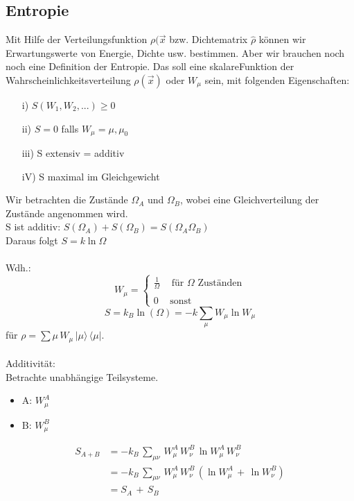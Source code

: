 \documentclass[a4paper,11pt]{scrartcl}
\begin{document}
\subsection{Entropie}
Mit Hilfe der Verteilungsfunktion $\rho(\vec{x}$ bzw. Dichtematrix $\hat{\rho}$ können wir Erwartungswerte von Energie, Dichte usw. bestimmen. Aber wir brauchen noch noch eine Definition der Entropie.  Das soll eine skalareFunktion der Wahrscheinlichkeitsverteilung $\rho(\vec{x})$ oder $W_{\mu}$ sein, mit folgenden Eigenschaften: \\
\begin{itemize}
 \item[i)] $S(W_1, W_2, ...) \geq 0$
 \item[ii)] $ S=0$ falls $W_{\mu} = \mu, \mu_0$
 \item[iii)] S extensiv = additiv
 \item[iV)] S maximal im Gleichgewicht
\end{itemize}
Wir betrachten die Zustände $\Omega_A$ und $\Omega_B$, wobei eine Gleichverteilung der Zustände angenommen wird.\\
S ist additiv: $ S(\Omega_A) + S(\Omega_B) = S(\Omega_A \Omega_B)$\\
Daraus folgt $S = k \ln{\Omega}$\\
\\
Wdh.: 
\begin{equation}
W_{\mu} = \left\{ \begin{array}{c} \frac{1}{\Omega} \,\,\,\,\,\,\, \mathrm{für} \,\, \Omega \,\, \mathrm{Zuständen} \\ \\ 0\,\,\,\,\,\,\, \mathrm{sonst}  \end{array} \right.
\end{equation}
\begin{equation}
 S = k_B \ln(\Omega) = - k \sum_{\mu} W_{\mu} \ln{W_{\mu}}
\end{equation}
für $\rho = \sum{\mu}\, W_{\mu} \, | \mu \rangle \, \langle \mu |$.\\
\\
Additivität:\\
Betrachte unabhängige Teilsysteme. \\
\begin{itemize}
 \item A: $W_{\mu}^A$
 \item B: $W_{\mu}^B$
\end{itemize}


\begin{align}
	S_{A+B} &= -k_B \, \sum_{\mu \nu}\, W_{\mu}^A \, W_{\nu}^B \, \ln{W_{\mu}^A \, W_{\nu}^B} \\
	 &= -k_B \, \sum_{\mu \nu}\, W_{\mu}^A \, W_{\nu}^B \, \left( \ln{W_{\mu}^A} \,+\, \ln{W_{\nu}^B} \right) \\
	 &= S_A \, +\, S_B 
\end{align}
\end{document}
